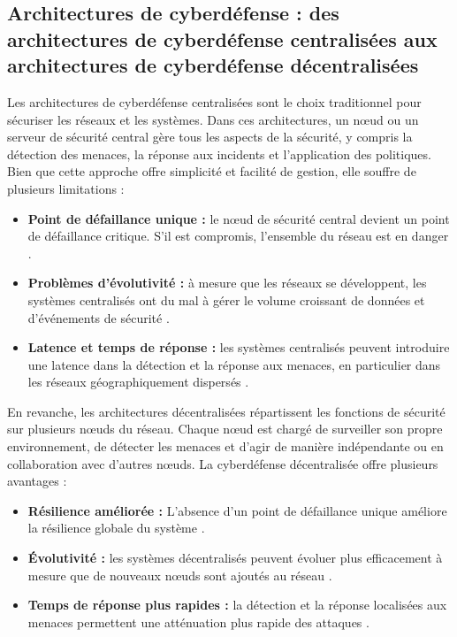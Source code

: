 \subsection{Architectures de cyberdéfense : des architectures de cyberdéfense centralisées aux architectures de cyberdéfense décentralisées}

Les architectures de cyberdéfense centralisées sont le choix traditionnel pour sécuriser les réseaux et les systèmes. Dans ces architectures, un nœud ou un serveur de sécurité central gère tous les aspects de la sécurité, y compris la détection des menaces, la réponse aux incidents et l'application des politiques. Bien que cette approche offre simplicité et facilité de gestion, elle souffre de plusieurs limitations :

\begin{itemize}
    \item \textbf{Point de défaillance unique :} le nœud de sécurité central devient un point de défaillance critique. S'il est compromis, l'ensemble du réseau est en danger \cite{Mell2011}.
    \item \textbf{Problèmes d'évolutivité :} à mesure que les réseaux se développent, les systèmes centralisés ont du mal à gérer le volume croissant de données et d'événements de sécurité \cite{Xu2019}.
    \item \textbf{Latence et temps de réponse :} les systèmes centralisés peuvent introduire une latence dans la détection et la réponse aux menaces, en particulier dans les réseaux géographiquement dispersés \cite{Benet2014}.
\end{itemize}

En revanche, les architectures décentralisées répartissent les fonctions de sécurité sur plusieurs nœuds du réseau. Chaque nœud est chargé de surveiller son propre environnement, de détecter les menaces et d'agir de manière indépendante ou en collaboration avec d'autres nœuds. La cyberdéfense décentralisée offre plusieurs avantages :

\begin{itemize}
    \item \textbf{Résilience améliorée :} L'absence d'un point de défaillance unique améliore la résilience globale du système \cite{Zohar2015}.
    \item \textbf{Évolutivité :} les systèmes décentralisés peuvent évoluer plus efficacement à mesure que de nouveaux nœuds sont ajoutés au réseau \cite{Xu2019}.
    \item \textbf{Temps de réponse plus rapides :} la détection et la réponse localisées aux menaces permettent une atténuation plus rapide des attaques \cite{Benet2014}.
\end{itemize}


